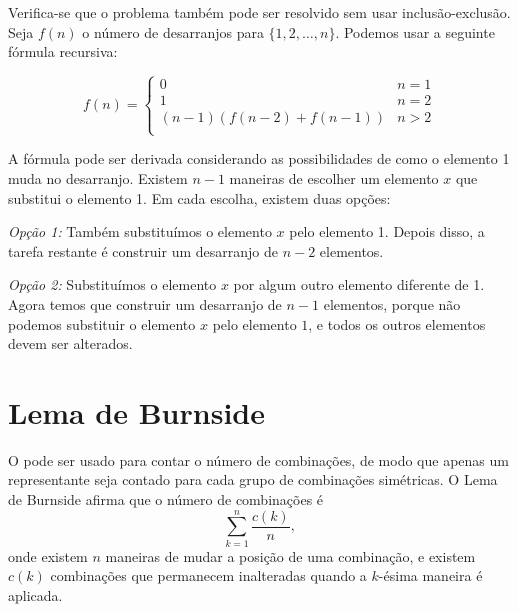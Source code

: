 Verifica-se que o problema também pode ser resolvido
sem usar inclusão-exclusão.
Seja $f(n)$ o número de desarranjos
para $\{1,2,\ldots,n\}$. Podemos usar a seguinte
fórmula recursiva:

\begin{equation*}
    f(n) = \begin{cases}
               0               & n = 1\\
               1               & n = 2\\
               (n-1)(f(n-2) + f(n-1)) & n>2 \\
           \end{cases}
\end{equation*}

A fórmula pode ser derivada considerando
as possibilidades de como o elemento 1 muda
no desarranjo.
Existem $n-1$ maneiras de escolher um elemento $x$
que substitui o elemento 1.
Em cada escolha, existem duas opções:

\textit{Opção 1:} Também substituímos o elemento $x$
pelo elemento 1.
Depois disso, a tarefa restante é construir
um desarranjo de $n-2$ elementos.

\textit{Opção 2:} Substituímos o elemento $x$
por algum outro elemento diferente de 1.
Agora temos que construir um desarranjo
de $n-1$ elementos, porque não podemos substituir
o elemento $x$ pelo elemento $1$, e todos os outros
elementos devem ser alterados.

\section{Lema de Burnside}


O 
pode ser usado para contar
o número de combinações, de modo que
apenas um representante seja contado
para cada grupo de combinações simétricas.
O Lema de Burnside afirma que o número de
combinações é
\[\sum_{k=1}^n \frac{c(k)}{n},\]
onde existem $n$ maneiras de mudar a
posição de uma combinação,
e existem $c(k)$ combinações que
permanecem inalteradas quando a $k$-ésima maneira é aplicada.

